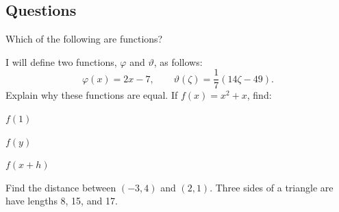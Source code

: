 \subsection*{Questions}
\begin{questions}
  \question Which of the following are functions?
  \question I will define two functions, $ \varphi $ and $ \vartheta $, as follows:
            \begin{displaymath}
              \varphi(x) = 2x - 7, \qquad \vartheta(\zeta) = \frac{1}{7}(14\zeta - 49).
            \end{displaymath}
            Explain why these functions are equal.
  \question If $ f(x) = x^2 + x $, find:
    \begin{parts}
      \item $ f(1) $
      \item $ f(y) $
      \item $ f(x + h) $
    \end{parts}
  \question Find the distance between $ (-3, 4) $ and $ (2, 1) $.
  \question Three sides of a triangle are have lengths 8, 15, and 17.
    \begin{parts}

\end{parts}
\end{questions}
